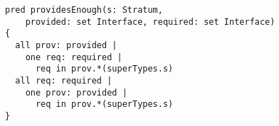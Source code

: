 \lstset{frame=tb, aboveskip=12pt, belowskip=-3pt, breaklines=true, basicstyle=\small\ttfamily, tabsize=2, mathescape=true}
\begin{lstlisting}[caption={bb\_inference\_help.als, lines 6-16}, label=alloy:providesenough, captionpos=b]
pred providesEnough(s: Stratum,
    provided: set Interface, required: set Interface)
{
  all prov: provided |
    one req: required |
      req in prov.*(superTypes.s)
  all req: required |
    one prov: provided |
      req in prov.*(superTypes.s)
}
\end{lstlisting}
